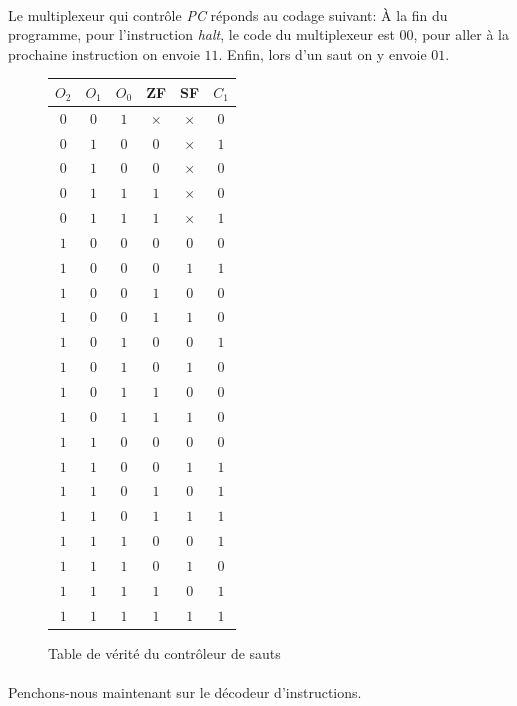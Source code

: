 \paragraph{}{
	Le multiplexeur qui contrôle \textit{PC} réponds au codage suivant:
	À la fin du programme, pour l'instruction \textit{halt}, le code du
	multiplexeur est $00$, pour aller à la prochaine instruction on envoie
	$11$. Enfin, lors d'un saut on y envoie $01$.
}

\begin{figure}
	\centering
	\begin{tabular}{|c|c|c|c|c|c|}
		\hline 
		$O_{2}$ & $O_{1}$ & $O_{0}$ & ZF & SF & $C_{1}$ \\ 
		\hline 
		$0$ & $0$ & $1$ & $\times$ & $\times$ & $0$ \\ 
		\hline 
		$0$ & $1$ & $0$ & $0$ & $\times$ & $1$ \\ 
		\hline 
		$0$ & $1$ & $0$ & $0$ & $\times$ & $0$ \\ 
		\hline 
		$0$ & $1$ & $1$ & $1$ & $\times$ & $0$ \\ 
		\hline 
		$0$ & $1$ & $1$ & $1$ & $\times$ & $1$ \\ 
		\hline 
		$1$ & $0$ & $0$ & $0$ & $0$ & $0$ \\ 
		\hline 
		$1$ & $0$ & $0$ & $0$ & $1$ & $1$ \\ 
		\hline 
		$1$ & $0$ & $0$ & $1$ & $0$ & $0$ \\ 
		\hline 
		$1$ & $0$ & $0$ & $1$ & $1$ & $0$ \\ 
		\hline 
		$1$ & $0$ & $1$ & $0$ & $0$ & $1$ \\ 
		\hline 
		$1$ & $0$ & $1$ & $0$ & $1$ & $0$ \\ 
		\hline 
		$1$ & $0$ & $1$ & $1$ & $0$ & $0$ \\ 
		\hline 
		$1$ & $0$ & $1$ & $1$ & $1$ & $0$ \\ 
		\hline 
		$1$ & $1$ & $0$ & $0$ & $0$ & $0$ \\ 
		\hline 
		$1$ & $1$ & $0$ & $0$ & $1$ & $1$ \\ 
		\hline 
		$1$ & $1$ & $0$ & $1$ & $0$ & $1$ \\ 
		\hline 
		$1$ & $1$ & $0$ & $1$ & $1$ & $1$ \\ 
		\hline 
		$1$ & $1$ & $1$ & $0$ & $0$ & $1$ \\ 
		\hline 
		$1$ & $1$ & $1$ & $0$ & $1$ & $0$ \\ 
		\hline 
		$1$ & $1$ & $1$ & $1$ & $0$ & $1$ \\ 
		\hline 
		$1$ & $1$ & $1$ & $1$ & $1$ & $1$ \\ 
		\hline 
	\end{tabular} 
	\caption{\label{ctrl_saut_tv} Table de vérité du contrôleur de sauts}
\end{figure}

\paragraph{}{
	Penchons-nous maintenant sur le décodeur d'instructions.
}